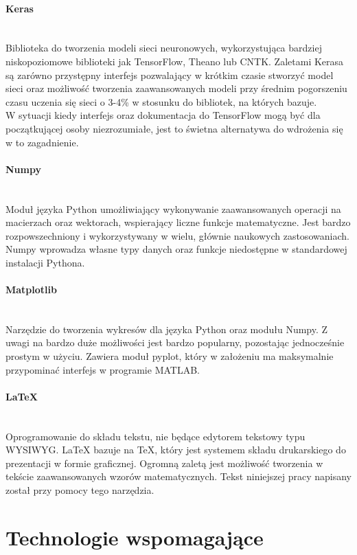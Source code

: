 \paragraph{Keras} \mbox{}\\
Biblioteka do tworzenia modeli sieci neuronowych, wykorzystująca bardziej niskopoziomowe
biblioteki jak TensorFlow, Theano lub CNTK. Zaletami Kerasa są
zarówno przystępny interfejs pozwalający w krótkim czasie stworzyć model sieci
oraz możliwość tworzenia zaawansowanych modeli przy średnim pogorszeniu czasu
uczenia się sieci o 3-4\% w stosunku do bibliotek, na których bazuje.\\
W sytuacji kiedy interfejs oraz dokumentacja do TensorFlow mogą być dla początkującej
osoby niezrozumiałe, jest to świetna alternatywa do wdrożenia się w to zagadnienie.

\paragraph{Numpy} \mbox{}\\
Moduł języka Python umożliwiający wykonywanie zaawansowanych operacji na macierzach
oraz wektorach, wspierający liczne funkcje matematyczne. Jest bardzo rozpowszechniony
i wykorzystywany w wielu, głównie naukowych zastosowaniach. Numpy wprowadza własne
typy danych oraz funkcje niedostępne w standardowej instalacji Pythona.

\paragraph{Matplotlib} \mbox{}\\
Narzędzie do tworzenia wykresów dla języka Python oraz modułu Numpy. Z uwagi na
bardzo duże możliwości jest bardzo popularny, pozostając jednocześnie prostym w
użyciu. Zawiera moduł pyplot, który w założeniu ma maksymalnie przypominać interfejs
w programie MATLAB.

\paragraph{LaTeX} \mbox{}\\
Oprogramowanie do składu tekstu, nie będące edytorem tekstowy typu WYSIWYG.
LaTeX bazuje na TeX, który jest systemem składu drukarskiego do prezentacji w
formie graficznej. Ogromną zaletą jest możliwość tworzenia w tekście zaawansowanych
wzorów matematycznych. Tekst niniejszej pracy napisany został przy pomocy tego narzędzia.

\section{Technologie wspomagające}

